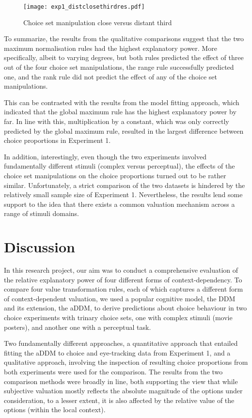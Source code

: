 \documentclass[11pt,a4paper]{article}
\begin{document}
\begin{figure}[!htb]
\captionsetup{justification=centering}
\centering
\caption{Choice set manipulation close versus distant third}
\texttt{[image: exp1\_distclosethirdres.pdf]}
\label{fig:closedist3rd_all}
\end{figure}


To summarize, the results from the qualitative comparisons suggest that the two maximum normalisation rules had the highest explanatory power. More specifically, albeit to varying degrees, but both rules predicted the effect of three out of the four choice set manipulations, the range rule successfully predicted one, and the rank rule did not predict the effect of any of the choice set manipulations.

This can be contrasted with the results from the model fitting approach, which indicated that the global maximum rule has the highest explanatory power by far. In line with this, multiplication by a constant, which was only correctly predicted by the global maximum rule, resulted in the largest difference between choice proportions in Experiment 1.


In addition, interestingly, even though the two experiments involved fundamentally different stimuli (complex versus perceptual), the effects of the choice set manipulations on the choice proportions turned out to be rather similar. Unfortunately, a strict comparison of the two datasets is hindered by the relatively small sample size of Experiment 1. Nevertheless, the results lend some support to the idea that there exists a common valuation mechanism across a range of stimuli domains.



\newpage

\section{Discussion}

In this research project, our aim was to conduct a comprehensive evaluation of the relative explanatory power of four different forms of context-dependency. To compare four value transformation rules, each of which captures a different form of context-dependent valuation, we used a popular cognitive model, the DDM and its extension, the aDDM, to derive predictions about choice behaviour in two choice experiments with trinary choice sets, one with complex stimuli (movie posters), and another one with a perceptual task.

Two fundamentally different approaches, a quantitative approach that entailed fitting the aDDM to choice and eye-tracking data from Experiment 1, and a qualitative approach, involving the inspection of resulting choice proportions from both experiments were used for the comparison. The results from the two comparison methods were broadly in line, both supporting the view that while subjective valuation mostly reflects the absolute magnitude of the options under consideration, to a lesser extent, it is also affected by the relative value of the options (within the local context).
\end{document}
